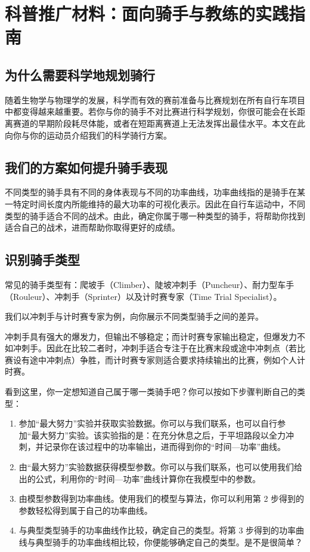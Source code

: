 \documentclass[11pt,a4paper]{ctexart}
\begin{document}
\section{科普推广材料：面向骑手与教练的实践指南}

\subsection{为什么需要科学地规划骑行}

随着生物学与物理学的发展，科学而有效的赛前准备与比赛规划在所有自行车项目中都变得越来越重要。若你与你的骑手不对比赛进行科学规划，你很可能会在长距离赛道的早期阶段耗尽体能，或者在短距离赛道上无法发挥出最佳水平。本文在此向你与你的运动员介绍我们的科学骑行方案。

\subsection{我们的方案如何提升骑手表现}

不同类型的骑手具有不同的身体表现与不同的功率曲线，功率曲线指的是骑手在某一特定时间长度内所能维持的最大功率的可视化表示。因此在自行车运动中，不同类型的骑手适合不同的战术。由此，确定你属于哪一种类型的骑手，将帮助你找到适合自己的战术，进而帮助你取得更好的成绩。

\subsection{识别骑手类型}

常见的骑手类型有：爬坡手（Climber）、陡坡冲刺手（Puncheur）、耐力型车手（Rouleur）、冲刺手（Sprinter）以及计时赛专家（Time Trial Specialist）。

我们以冲刺手与计时赛专家为例，向你展示不同类型骑手之间的差异。

冲刺手具有强大的爆发力，但输出不够稳定；而计时赛专家输出稳定，但爆发力不如冲刺手。因此在比较二者时，冲刺手适合专注于在比赛末段或途中冲刺点（若比赛设有途中冲刺点）争胜，而计时赛专家则适合要求持续输出的比赛，例如个人计时赛。

看到这里，你一定想知道自己属于哪一类骑手吧？你可以按如下步骤判断自己的类型：

\begin{enumerate}
\item 参加“最大努力”实验并获取实验数据。你可以与我们联系，也可以自行参加“最大努力”实验。该实验指的是：在充分休息之后，于平坦路段以全力冲刺，并记录你在该过程中的功率输出，进而得到你的“时间—功率”曲线。
\item 由“最大努力”实验数据获得模型参数。你可以与我们联系，也可以使用我们给出的公式，利用你的“时间—功率”曲线计算你在我模型中的参数。
\item 由模型参数得到功率曲线。使用我们的模型与算法，你可以利用第 2 步得到的参数轻松得到属于自己的功率曲线。
\item 与典型类型骑手的功率曲线作比较，确定自己的类型。将第 3 步得到的功率曲线与典型骑手的功率曲线相比较，你便能够确定自己的类型。是不是很简单？
\end{enumerate}
\end{document}
